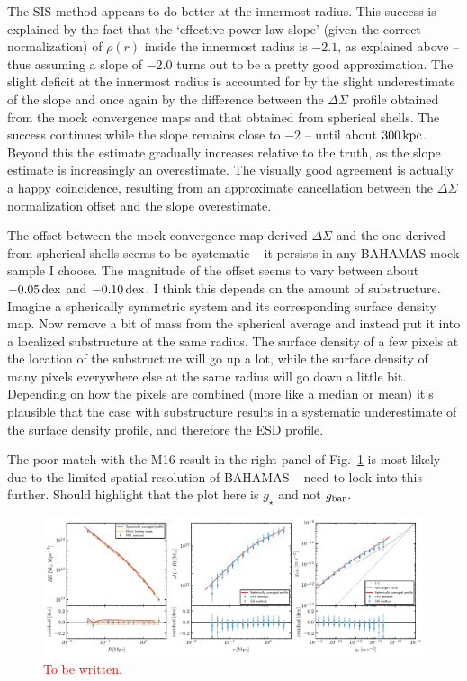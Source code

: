 \documentclass[usenatbib]{mnras}
\newcommand{\dex}{\, {\rm dex}}
\begin{document}
The SIS method appears to do better at the innermost radius. This success is explained by the fact that the `effective power law slope' (given the correct normalization) of $\rho(r)$ inside the innermost radius is $-2.1$, as explained above -- thus assuming a slope of $-2.0$ turns out to be a pretty good approximation. The slight deficit at the innermost radius is accounted for by the slight underestimate of the slope and once again by the difference between the $\Delta\Sigma$ profile obtained from the mock convergence maps and that obtained from spherical shells. The success continues while the slope remains close to $-2$ -- until about $300\,{\rm kpc}$. Beyond this the estimate gradually increases relative to the truth, as the slope estimate is increasingly an overestimate. The visually good agreement is actually a happy coincidence, resulting from an approximate cancellation between the $\Delta\Sigma$ normalization offset and the slope overestimate.

The offset between the mock convergence map-derived $\Delta\Sigma$ and the one derived from spherical shells seems to be systematic -- it persists in any BAHAMAS mock sample I choose. The magnitude of the offset seems to vary between about $-0.05 \dex$ and $-0.10 \dex$. I think this depends on the amount of substructure. Imagine a spherically symmetric system and its corresponding surface density map. Now remove a bit of mass from the spherical average and instead put it into a localized substructure at the same radius. The surface density of a few pixels at the location of the substructure will go up a lot, while the surface density of many pixels everywhere else at the same radius will go down a little bit. Depending on how the pixels are combined (more like a median or mean) it's plausible that the case with substructure results in a systematic underestimate of the surface density profile, and therefore the ESD profile.

The poor match with the M16 result in the right panel of Fig.~\ref{fig:compare_method} is most likely due to the limited spatial resolution of BAHAMAS -- need to look into this further. Should highlight that the plot here is $g_\star$ and not $g_{\rm bar}$.

\begin{figure}
  \includegraphics[width=\textwidth]{Figures/compare_method}
  \caption{\textcolor{red}{To be written.}}
  \label{fig:compare_method}
\end{figure}
\end{document}
